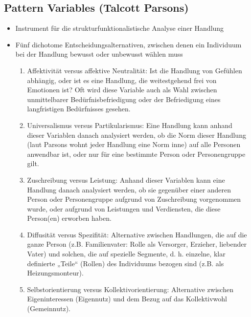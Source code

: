 \documentclass{scrartcl}
\begin{document}
\subsection*{Pattern Variables (Talcott Parsons)}
\begin{itemize}
    \item
        Instrument für die strukturfunktionalistische Analyse einer Handlung
    \item
        Fünf dichotome Entscheidungsalternativen, zwischen denen ein Individuum bei der Handlung bewusst oder unbewusst wählen muss
        \begin{enumerate}
            \item
                Affektivität versus affektive Neutralität: Ist die Handlung von Gefühlen abhängig, oder ist es eine Handlung, die weitestgehend frei von Emotionen ist? Oft wird diese Variable auch als Wahl zwischen unmittelbarer Bedürfnisbefriedigung oder der Befriedigung eines langfristigen Bedürfnisses gesehen.
            \item
                Universalismus versus Partikularismus: Eine Handlung kann anhand dieser Variablen danach analysiert werden, ob die Norm dieser Handlung (laut Parsons wohnt jeder Handlung eine Norm inne) auf alle Personen anwendbar ist, oder nur für eine bestimmte Person oder Personengruppe gilt.
            \item
                Zuschreibung versus Leistung: Anhand dieser Variablen kann eine Handlung danach analysiert werden, ob sie gegenüber einer anderen Person oder Personengruppe aufgrund von Zuschreibung vorgenommen wurde, oder aufgrund von Leistungen und Verdiensten, die diese Person(en) erworben haben.
            \item
                Diffusität versus Spezifität: Alternative zwischen Handlungen, die auf die ganze Person (z.B. Familienvater: Rolle als Versorger, Erzieher, liebender Vater) und solchen, die auf spezielle Segmente, d. h. einzelne, klar definierte „Teile“ (Rollen) des Individuums bezogen sind (z.B. als Heizungsmonteur).
            \item
                Selbstorientierung versus Kollektivorientierung: Alternative zwischen Eigeninteressen (Eigennutz) und dem Bezug auf das Kollektivwohl (Gemeinnutz).
        \end{enumerate}
\end{itemize}
\end{document}

